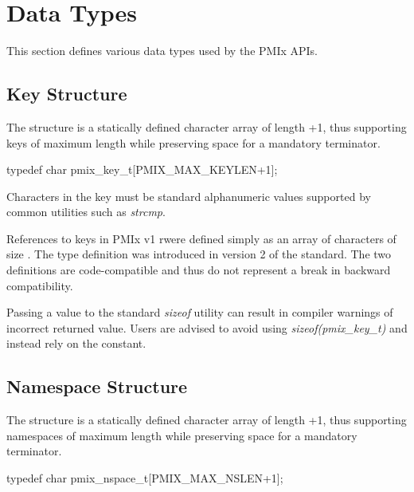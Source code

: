 \section{Data Types}

This section defines various data types used by the PMIx APIs.

\subsection{Key Structure}

The  structure is a statically defined character array of length +1, thus supporting keys of maximum length  while preserving space for a mandatory  terminator.

\cspecificstart
\begin{codepar}
typedef char pmix_key_t[PMIX_MAX_KEYLEN+1];
\end{codepar}
\cspecificend

Characters in the key must be standard alphanumeric values supported by common utilities such as \textit{strcmp}.

\adviceuserstart
References to keys in \ac{PMIx} v1 rwere defined simply as an array of characters of size . The  type definition was introduced in version 2 of the standard. The two definitions are code-compatible and thus do not represent a break in backward compatibility.

Passing a  value to the standard \textit{sizeof} utility can result in compiler warnings of incorrect returned value. Users are advised to avoid using \textit{sizeof(pmix_key_t)} and instead rely on the  constant.
\adviceuserend

\subsection{Namespace Structure}

The  structure is a statically defined character array of length +1, thus supporting namespaces of maximum length  while preserving space for a mandatory  terminator.

\cspecificstart
\begin{codepar}
typedef char pmix_nspace_t[PMIX_MAX_NSLEN+1];
\end{codepar}
\cspecificend


